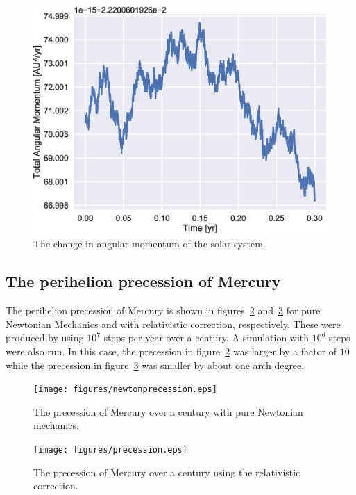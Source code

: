 \documentclass[aps,reprint]{revtex4-1}
\begin{document}
\begin{figure}[H]
  \centering
  \includegraphics[width=\columnwidth]{figures/fullsystem_ang.eps}
  \caption{\label{fig:fullsystemang} The change in angular momentum of the solar
  system.}
\end{figure}


\subsection{The perihelion precession of Mercury}

The perihelion precession of Mercury is shown in figures~\ref{fig:newtonper}
and~\ref{fig:relatper} for pure Newtonian Mechanics and with relativistic
correction, respectively. These were produced by using \(10^{7}\) steps per year
over a century. A simulation with \(10^{6}\) steps were also run. In this case,
the precession in figure~\ref{fig:newtonper} was larger by a factor of \(10\)
while the precession in figure~\ref{fig:relatper} was smaller by about one arch degree.

\begin{figure}[H]
  \centering
  \texttt{[image: figures/newtonprecession.eps]}
  \caption{\label{fig:newtonper} The precession of Mercury over a century with
    pure Newtonian mechanics.}
\end{figure}

\begin{figure}[H]
  \centering
  \texttt{[image: figures/precession.eps]}
  \caption{\label{fig:relatper} The precession of Mercury over a century using
    the relativistic correction.}
\end{figure}
\end{document}
